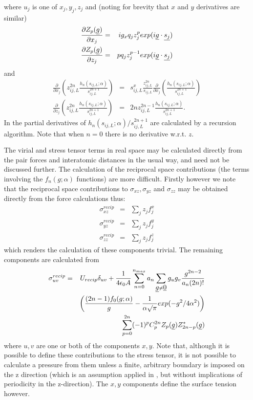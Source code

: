 where $u_{j}$ is one of $x_{j},y_{j},z_{j}$ and (noting for brevity
that $x$ and $y$ derivatives are similar)
\begin{eqnarray}
\frac{\partial Z_{p}(\mbox{$\underline{g}$})}{\partial x_{j}}&=&ig_{x}q_{j}z_{j}^{p}
exp(i\mbox{$\underline{g}$}\cdot\mbox{$\underline{s_{j}}$}) \nonumber \\
\frac{\partial Z_{p}(\mbox{$\underline{g}$})}{\partial z_{j}}&=&pq_{j}z_{j}^{p-1}
exp(i\mbox{$\underline{g}$}\cdot\mbox{$\underline{s_{j}}$})
\end{eqnarray}
and 
\begin{eqnarray}
\frac{\partial}{\partial x_{j}}\left ( z_{ij,L}^{2n} 
\frac{h_{n}(s_{ij,L};\alpha)}{s_{ij,L}^{2n+1}} \right )&=&
s_{ij,L}^{x}\frac{z_{ij,L}^{2n} }{s_{ij,L}}
\frac{\partial}{\partial x_{j}}\left
(\frac{h_{n}(s_{ij,L};\alpha)}{s_{ij,L}^{2n+1}} \right ) 
\nonumber \\
\frac{\partial}{\partial z_{j}}\left ( z_{ij,L}^{2n} 
\frac{h_{n}(s_{ij,L};\alpha)}{s_{ij,L}^{2n+1}} \right )&=&
2n z_{ij,L}^{2n-1} \frac{h_{n}(s_{ij,L};\alpha)}{s_{ij,L}^{2n+1}}. 
\end{eqnarray}
In \D{} the partial derivatives of
$h_{n}(s_{ij,L};\alpha)/s_{ij,L}^{2n+1}$
are calculated by a recursion algorithm. Note that when $n=0$ there is
no derivative w.r.t. $z$.

The virial and stress tensor terms in real space may be calculated
directly from the pair forces and interatomic distances in the usual
way, and need not be discussed further.  The calculation of the
reciprocal space contributions (the terms involving the
$f_{n}(g;\alpha)$ functions) are more difficult. Firstly however we
note that the reciprocal space contributions to $\sigma_{xz},\sigma_{yz}$ and
$\sigma_{zz}$ may be obtained directly from the force calculations
thus:
\begin{eqnarray}
	\sigma^{recip}_{xz}&=&\sum_{j} z_{j}f_{j}^{x} \nonumber \\
	\sigma^{recip}_{yz}&=&\sum_{j} z_{j}f_{j}^{y} \\
	\sigma^{recip}_{zz}&=&\sum_{j} z_{j}f_{j}^{z} \nonumber
\end{eqnarray}
which renders the calculation of these components trivial. The 
remaining components are calculated from
\begin{eqnarray}
\sigma^{recip}_{uv}&=&U_{recip}\delta_{uv}+\frac{1}{4\epsilon_{0}A}
\sum_{n=0}^{n_{max}} a_{n}
\sum_{\mbox{$\underline{g}$}\ne \mbox{$\underline{0}$}} g_{u}g_{v}\frac{g^{2n-2}}{a_{n}(2n)!} \nonumber \\
 & & \left
 (\frac{(2n-1)f_{0}(g;\alpha)}{g}-\frac{1}{\alpha\surd{\pi}}exp(-g^{2}/4\alpha^{2})\right
 )  \\
 & & \sum_{p=0}^{2n}(-1)^{p}C_{p}^{2n}Z_{p}(\mbox{$\underline{g}$})Z_{2n-p}^{*}(\mbox{$\underline{g}$})
\nonumber 
\end{eqnarray}
where $u,v$ are one or both of the components $x,y$.  Note that,
although it is possible to define these contributions to the stress
tensor, it is not possible to calculate a pressure from them unless a
finite, arbitrary boundary is imposed on the z direction (which is an
assumption applied in \D{}, but without implications of periodicity in
the z-direction). The $x,y$ components define the surface tension
however.

